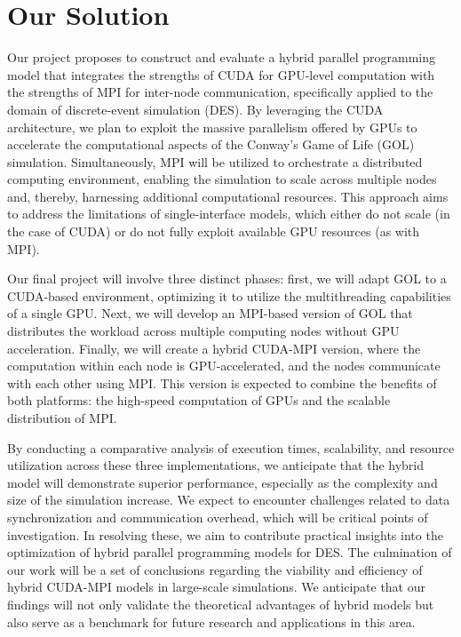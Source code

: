 \documentclass[11pt]{article}
\begin{document}
\section {Our Solution}\label{soln}
Our project proposes to construct and evaluate a hybrid parallel programming model that integrates the strengths of CUDA for GPU-level computation with the strengths of MPI for inter-node communication, specifically applied to the domain of discrete-event simulation (DES). By leveraging the CUDA architecture, we plan to exploit the massive parallelism offered by GPUs to accelerate the computational aspects of the Conway’s Game of Life (GOL) simulation. Simultaneously, MPI will be utilized to orchestrate a distributed computing environment, enabling the simulation to scale across multiple nodes and, thereby, harnessing additional computational resources. This approach aims to address the limitations of single-interface models, which either do not scale (in the case of CUDA) or do not fully exploit available GPU resources (as with MPI).

Our final project will involve three distinct phases: first, we will adapt GOL to a CUDA-based environment, optimizing it to utilize the multithreading capabilities of a single GPU. Next, we will develop an MPI-based version of GOL that distributes the workload across multiple computing nodes without GPU acceleration. Finally, we will create a hybrid CUDA-MPI version, where the computation within each node is GPU-accelerated, and the nodes communicate with each other using MPI. This version is expected to combine the benefits of both platforms: the high-speed computation of GPUs and the scalable distribution of MPI.

By conducting a comparative analysis of execution times, scalability, and resource utilization across these three implementations, we anticipate that the hybrid model will demonstrate superior performance, especially as the complexity and size of the simulation increase. We expect to encounter challenges related to data synchronization and communication overhead, which will be critical points of investigation. In resolving these, we aim to contribute practical insights into the optimization of hybrid parallel programming models for DES. The culmination of our work will be a set of conclusions regarding the viability and efficiency of hybrid CUDA-MPI models in large-scale simulations. We anticipate that our findings will not only validate the theoretical advantages of hybrid models but also serve as a benchmark for future research and applications in this area. 
\end{document}
